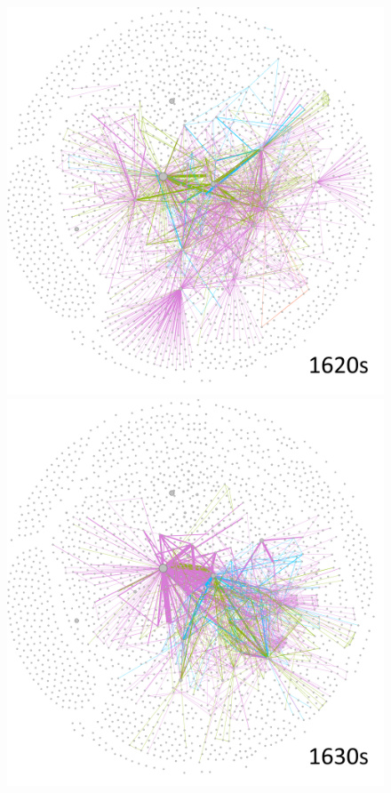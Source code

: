 \documentclass[12pt,a4paper,oneside]{book}
\begin{document}
\begin{sloppypar}
\begin{figure}[H]
\includegraphics[scale=0.4]{graph/People_1620s.png}
\includegraphics[scale=0.4]{graph/People_1630s.png}

\end{figure}
\end{sloppypar}
\end{document}
